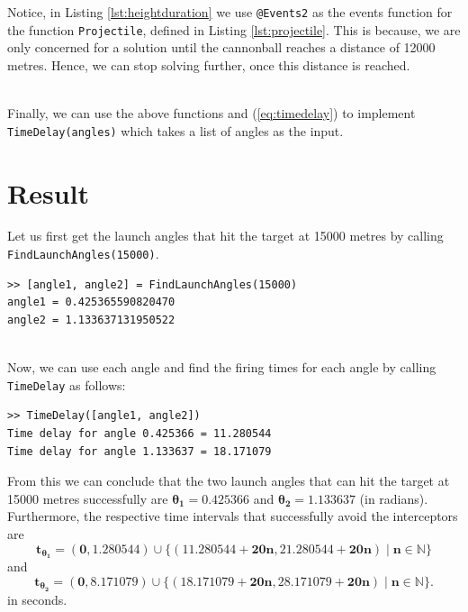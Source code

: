 \documentclass[11pt]{report}
\begin{document}
Notice, in Listing \ref{lst:heightduration} we use \texttt{@Events2} as the events function for the function \texttt{Projectile}, defined in Listing \ref{lst:projectile}. This is because, we are only concerned for a solution until the cannonball reaches a distance of 12000 metres. Hence, we can stop solving further, once this distance is reached.


\ \\
Finally, we can use the above functions and (\ref{eq:timedelay}) to implement \texttt{TimeDelay(angles)} which takes a list of angles as the input. \\



\section{Result}
Let us first get the launch angles that hit the target at 15000 metres by calling \texttt{FindLaunchAngles(15000)}.

\begin{lstlisting}[title={Firing Angles (in radians) to hit target at 15000m.}]
>> [angle1, angle2] = FindLaunchAngles(15000)
angle1 = 0.425365590820470
angle2 = 1.133637131950522
\end{lstlisting}

\ \\
Now, we can use each angle and find the firing times for each angle by calling \texttt{TimeDelay} as follows:

\begin{lstlisting}[title={Time delays for both firing angles.}]
>> TimeDelay([angle1, angle2])
Time delay for angle 0.425366 = 11.280544
Time delay for angle 1.133637 = 18.171079
\end{lstlisting}

From this we can conclude that the two launch angles that can hit the target at 15000 metres successfully are $\boldsymbol{\theta_1 = 0.425366}$ and $\boldsymbol{\theta_2 = 1.133637}$ (in radians). Furthermore, the respective time intervals that successfully avoid the interceptors are
 $$\boldsymbol{t_{\theta_1} = (0, 1.280544) \cup \{(11.280544 + 20n, 21.280544 + 20n) \mid n \in \mathbb{N}\}}$$ 
 and
 $$\boldsymbol{t_{\theta_2} = (0, 8.171079) \cup  \{(18.171079 + 20n, 28.171079 + 20n) \mid n \in \mathbb{N}\}}.$$
 in seconds.
\end{document}
